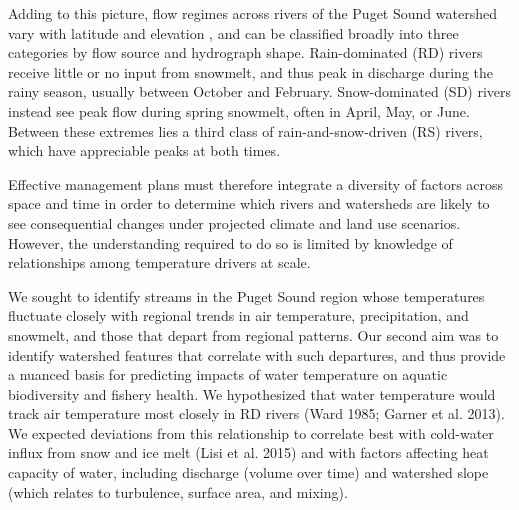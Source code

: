 \documentclass[notitlepage]{article}
\begin{document}
Adding to this picture, flow regimes across rivers of the Puget Sound watershed vary with latitude and elevation \cite{reidy2012hydrogeomorphic,mauger2015CIG}, and can be classified broadly into three categories by flow source and hydrograph shape. Rain-dominated (RD) rivers receive little or no input from snowmelt, and thus peak in discharge during the rainy season, usually between October and February. Snow-dominated (SD) rivers instead see peak flow during spring snowmelt, often in April, May, or June. Between these extremes lies a third class of rain-and-snow-driven (RS) rivers, which have appreciable peaks at both times.

Effective management plans must therefore integrate a diversity of factors across space and time in order to determine which rivers and watersheds are likely to see consequential changes under projected climate and land use scenarios. However, the understanding required to do so is limited by knowledge of relationships among temperature drivers at scale. 


We sought to identify streams in the Puget Sound region whose temperatures fluctuate closely with regional trends in air temperature, precipitation, and snowmelt, and those that depart from regional patterns. Our second aim was to identify watershed features that correlate with such departures, and thus provide a nuanced basis for predicting impacts of water temperature on aquatic biodiversity and fishery health. We hypothesized that water temperature would track air temperature most closely in RD rivers (Ward 1985; Garner et al. 2013). We expected deviations from this relationship to correlate best with cold-water influx from snow and ice melt (Lisi et al. 2015) and with factors affecting heat capacity of water, including discharge (volume over time) and watershed slope (which relates to turbulence, surface area, and mixing).

\end{document}
